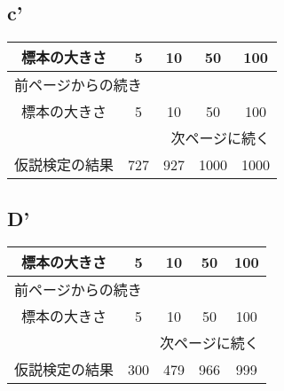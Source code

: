 \documentclass{scrartcl}
\begin{document}
\subsection{c'}
\label{sec:orgf8de22d}
\begin{longtable}{|c|c|c|c|c|}
\hline
標本の大きさ & 5 & 10 & 50 & 100\\
\hline
\endfirsthead
\multicolumn{5}{l}{前ページからの続き} \\
\hline

標本の大きさ & 5 & 10 & 50 & 100 \\

\hline
\endhead
\hline\multicolumn{5}{r}{次ページに続く} \\
\endfoot
\endlastfoot
\hline
仮説検定の結果 & 727 & 927 & 1000 & 1000\\
\hline
\end{longtable}
\subsection{D'}
\label{sec:org6f6e8f4}
\begin{longtable}{|c|c|c|c|c|}
\hline
標本の大きさ & 5 & 10 & 50 & 100\\
\hline
\endfirsthead
\multicolumn{5}{l}{前ページからの続き} \\
\hline

標本の大きさ & 5 & 10 & 50 & 100 \\

\hline
\endhead
\hline\multicolumn{5}{r}{次ページに続く} \\
\endfoot
\endlastfoot
\hline
仮説検定の結果 & 300 & 479 & 966 & 999\\
\hline
\end{longtable}
\end{document}
